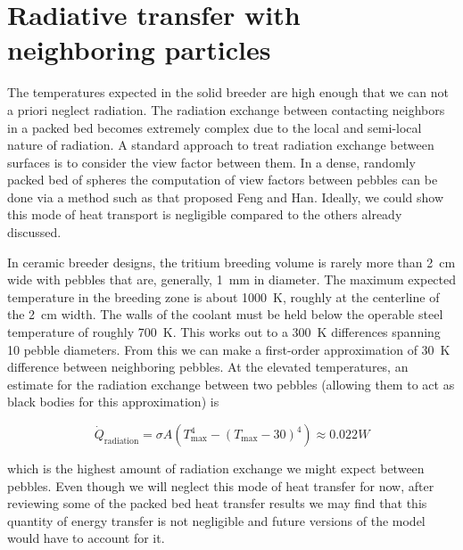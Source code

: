 \section{Radiative transfer with neighboring particles}

The temperatures expected in the solid breeder are high enough that we can not a priori neglect radiation. The radiation exchange between contacting neighbors in a packed bed becomes extremely complex due to the local and semi-local nature of radiation. A standard approach to treat radiation exchange between surfaces is to consider the view factor between them. In a dense, randomly packed bed of spheres the computation of view factors between pebbles can be done via a method such as that proposed Feng and Han\cite{Feng2012}. Ideally, we could show this mode of heat transport is negligible compared to the others already discussed.

In ceramic breeder designs, the tritium breeding volume is rarely more than \si{2 cm} wide with pebbles that are, generally, \si{1 mm} in diameter. The maximum expected temperature in the breeding zone is about \si{1000 K}, roughly at the centerline of the \si{2 cm} width. The walls of the coolant must be held below the operable steel temperature of roughly \si{700 K}. This works out to a \si{300 K} differences spanning 10 pebble diameters. From this we can make a first-order approximation of \si{30 K} difference between neighboring pebbles. At the elevated temperatures, an estimate for the radiation exchange between two pebbles (allowing them to act as black bodies for this approximation) is

\begin{equation}
	\dot{Q}_\text{radiation} = \sigma A \left(T_\text{max}^4 - (T_\text{max}-30)^4\right) \approx 0.022\si{W}
\end{equation}
 
 which is the highest amount of radiation exchange we might expect between pebbles. Even though we will neglect this mode of heat transfer for now, after reviewing some of the packed bed heat transfer results we may find that this quantity of energy transfer is not negligible and future versions of the model would have to account for it.
